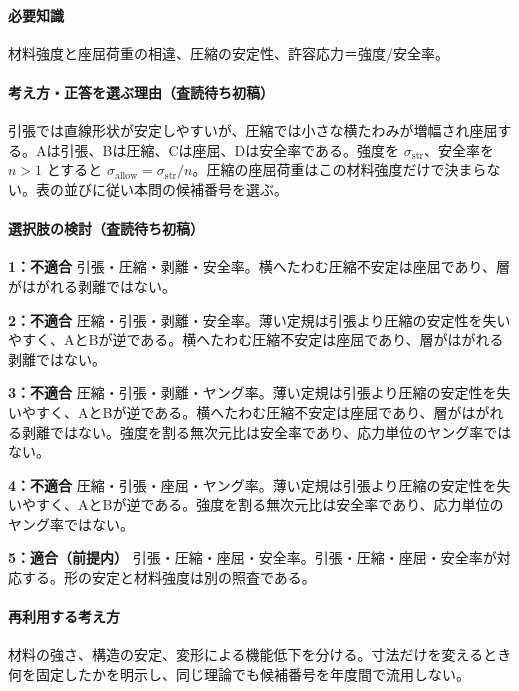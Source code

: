 \paragraph{必要知識} 材料強度と座屈荷重の相違、圧縮の安定性、許容応力＝強度/安全率。

\paragraph{考え方・正答を選ぶ理由（査読待ち初稿）} 引張では直線形状が安定しやすいが、圧縮では小さな横たわみが増幅され座屈する。Aは引張、Bは圧縮、Cは座屈、Dは安全率である。強度を \(\sigma_{\mathrm{str}}\)、安全率を \(n>1\) とすると \(\sigma_{\mathrm{allow}}=\sigma_{\mathrm{str}}/n\)。圧縮の座屈荷重はこの材料強度だけで決まらない。表の並びに従い本問の候補番号を選ぶ。

\paragraph{選択肢の検討（査読待ち初稿）}\mbox{}\par

\noindent\textbf{1：不適合} 引張・圧縮・剥離・安全率。横へたわむ圧縮不安定は座屈であり、層がはがれる剥離ではない。\par

\noindent\textbf{2：不適合} 圧縮・引張・剥離・安全率。薄い定規は引張より圧縮の安定性を失いやすく、AとBが逆である。横へたわむ圧縮不安定は座屈であり、層がはがれる剥離ではない。\par

\noindent\textbf{3：不適合} 圧縮・引張・剥離・ヤング率。薄い定規は引張より圧縮の安定性を失いやすく、AとBが逆である。横へたわむ圧縮不安定は座屈であり、層がはがれる剥離ではない。強度を割る無次元比は安全率であり、応力単位のヤング率ではない。\par

\noindent\textbf{4：不適合} 圧縮・引張・座屈・ヤング率。薄い定規は引張より圧縮の安定性を失いやすく、AとBが逆である。強度を割る無次元比は安全率であり、応力単位のヤング率ではない。\par

\noindent\textbf{5：適合（前提内）} 引張・圧縮・座屈・安全率。引張・圧縮・座屈・安全率が対応する。形の安定と材料強度は別の照査である。\par

\paragraph{再利用する考え方} 材料の強さ、構造の安定、変形による機能低下を分ける。寸法だけを変えるとき何を固定したかを明示し、同じ理論でも候補番号を年度間で流用しない。

